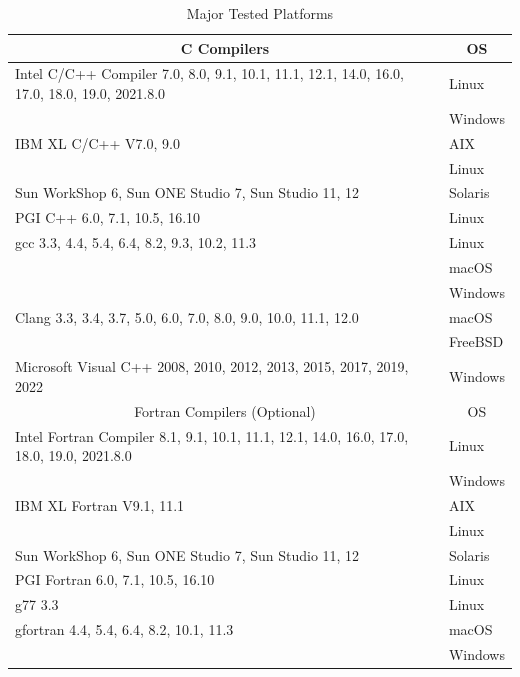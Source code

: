 \documentclass[a4paper]{article}
\begin{document}
\begin{table}[htbp]
\caption{Major Tested Platforms}
\label{platforms}
\begin{center}
{\small
 \begin{tabular}{l|l}
\hline
\multicolumn{1}{c|}{C Compilers} & \multicolumn{1}{c}{OS} \\
\hline
Intel C/C++ Compiler 7.0, 8.0, 9.1, 10.1, 11.1, 12.1, 14.0, 16.0, 17.0, 18.0, 19.0, 2021.8.0 & Linux \\
                                                     & Windows  \\
\hline
IBM XL C/C++ V7.0, 9.0                     & AIX     \\
                                           & Linux   \\
\hline
Sun WorkShop 6, Sun ONE Studio 7, Sun Studio 11, 12  & Solaris \\
\hline
PGI C++ 6.0, 7.1, 10.5, 16.10              & Linux \\
\hline
gcc 3.3, 4.4, 5.4, 6.4, 8.2, 9.3, 10.2, 11.3     & Linux \\
                                           & macOS \\
                                           & Windows \\
\hline
Clang 3.3, 3.4, 3.7, 5.0, 6.0, 7.0, 8.0, 9.0, 10.0, 11.1, 12.0 & macOS \\
                                           & FreeBSD \\
\hline
Microsoft Visual C++ 2008, 2010, 2012, 2013, 2015, 2017, 2019, 2022 & Windows \\
\hline
\hline
\multicolumn{1}{c|}{Fortran Compilers (Optional)} & \multicolumn{1}{c}{OS} \\
\hline
Intel Fortran Compiler 8.1, 9.1, 10.1, 11.1, 12.1, 14.0, 16.0, 17.0, 18.0, 19.0, 2021.8.0 & Linux \\
                                                  & Windows  \\
\hline
IBM XL Fortran V9.1, 11.1                  & AIX     \\
                                           & Linux   \\
\hline
Sun WorkShop 6, Sun ONE Studio 7, Sun Studio 11, 12  & Solaris \\
\hline
PGI Fortran 6.0, 7.1, 10.5, 16.10          & Linux \\
\hline
g77 3.3                                    & Linux \\
gfortran 4.4, 5.4, 6.4, 8.2, 10.1, 11.3    & macOS \\
                                           & Windows \\
\hline
\end{tabular}
}
\end{center}
\end{table} 
\end{document}
